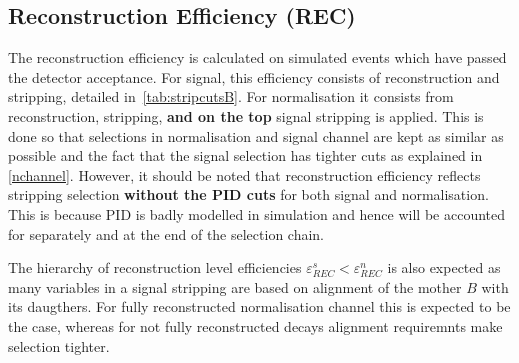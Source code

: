 
\subsection{Reconstruction Efficiency (REC)}
The reconstruction efficiency is calculated on simulated events which have passed the detector acceptance. For signal, this efficiency consists of reconstruction and stripping, detailed in~\autoref{tab:stripcutsB}. For normalisation it consists from reconstruction, stripping, \textbf{and on the top} signal stripping is applied. This is done so that selections in normalisation and signal channel are kept as similar as possible and the fact that the signal selection has tighter cuts as explained in \autoref{nchannel}. However, it should be noted that reconstruction efficiency reflects stripping selection \textbf{without the PID cuts} for both signal and normalisation. This is because \gls{PID} is badly modelled in simulation and hence will be accounted for separately and at the end of the selection chain.

The hierarchy of reconstruction level efficiencies $\varepsilon^{s}_{REC} < \varepsilon^{n}_{REC}$ is also expected as many variables in a signal stripping are based on alignment of the mother $B$ with its daugthers. For fully reconstructed normalisation channel this is expected to be the case, whereas for not fully reconstructed decays alignment requiremnts make selection tighter. 

